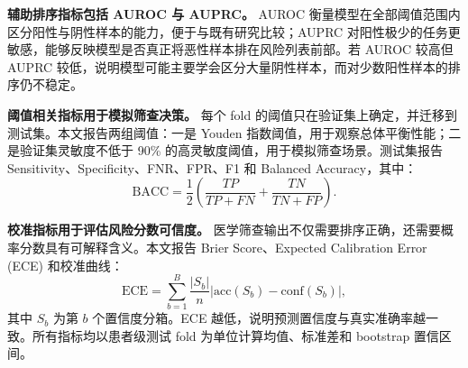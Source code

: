 \documentclass[UTF8,a4paper,10pt,twocolumn,fontset=fandol]{ctexart}
\begin{document}
\textbf{辅助排序指标包括 AUROC 与 AUPRC。} AUROC 衡量模型在全部阈值范围内区分阳性与阴性样本的能力，便于与既有研究比较；AUPRC 对阳性极少的任务更敏感，能够反映模型是否真正将恶性样本排在风险列表前部。若 AUROC 较高但 AUPRC 较低，说明模型可能主要学会区分大量阴性样本，而对少数阳性样本的排序仍不稳定。

\textbf{阈值相关指标用于模拟筛查决策。} 每个 fold 的阈值只在验证集上确定，并迁移到测试集。本文报告两组阈值：一是 Youden 指数阈值，用于观察总体平衡性能；二是验证集灵敏度不低于 90\% 的高灵敏度阈值，用于模拟筛查场景。测试集报告 Sensitivity、Specificity、FNR、FPR、F1 和 Balanced Accuracy，其中：
\begin{equation}
    \mathrm{BACC}=\frac{1}{2}\left(\frac{TP}{TP+FN}+\frac{TN}{TN+FP}\right).
\end{equation}

\textbf{校准指标用于评估风险分数可信度。} 医学筛查输出不仅需要排序正确，还需要概率分数具有可解释含义。本文报告 Brier Score、Expected Calibration Error (ECE) 和校准曲线：
\begin{equation}
    \mathrm{ECE}=\sum_{b=1}^{B}\frac{|S_b|}{n}\left|\mathrm{acc}(S_b)-\mathrm{conf}(S_b)\right|,
\end{equation}
其中 $S_b$ 为第 $b$ 个置信度分箱。ECE 越低，说明预测置信度与真实准确率越一致。所有指标均以患者级测试 fold 为单位计算均值、标准差和 bootstrap 置信区间。
\end{document}
